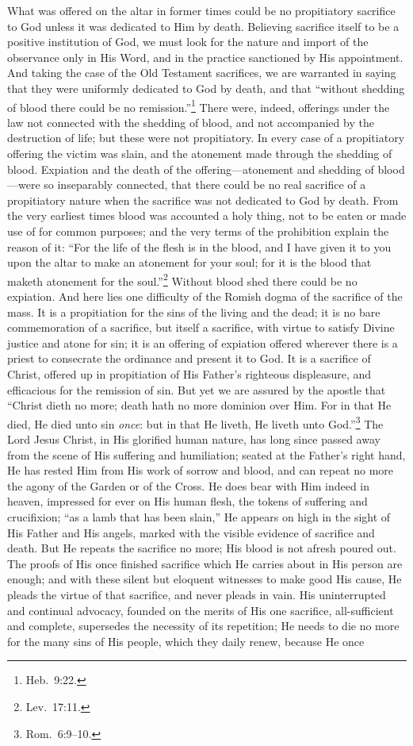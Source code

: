 \documentclass[
  english,
]{book}
\begin{document}
What was offered on the altar in former times could be no propitiatory sacrifice to God unless it was dedicated to Him by death. Believing sacrifice itself to be a positive institution of God, we must look for the nature and import of the observance only in His Word, and in the practice sanctioned by His appointment. And taking the case of the Old Testament sacrifices, we are warranted in saying that they were uniformly dedicated to God by death, and that ``without shedding of blood there could be no remission.''\footnote{Heb.~9:22.} There were, indeed, offerings under the law not connected with the shedding of blood, and not accompanied by the destruction of life; but these were not propitiatory. In every case of a propitiatory offering the victim was slain, and the atonement made through the shedding of blood. Expiation and the death of the offering---atonement and shedding of blood---were so inseparably connected, that there could be no real sacrifice of a propitiatory nature when the sacrifice was not dedicated to God by death. From the very earliest times blood was accounted a holy thing, not to be eaten or made use of for common purposes; and the very terms of the prohibition explain the reason of it: ``For the life of the flesh is in the blood, and I have given it to you upon the altar to make an atonement for your soul; for it is the blood that maketh atonement for the soul.''\footnote{Lev.~17:11.} Without blood shed there could be no expiation. And here lies one difficulty of the Romish dogma of the sacrifice of the mass. It is a propitiation for the sins of the living and the dead; it is no bare commemoration of a sacrifice, but itself a sacrifice, with virtue to satisfy Divine justice and atone for sin; it is an offering of expiation offered wherever there is a priest to consecrate the ordinance and present it to God. It is a sacrifice of Christ, offered up in propitiation of His Father's righteous displeasure, and efficacious for the remission of sin. But yet we are assured by the apostle that ``Christ dieth no more; death hath no more dominion over Him. For in that He died, He died unto sin \emph{once}: but in that He liveth, He liveth unto God.''\footnote{Rom.~6:9--10.} The Lord Jesus Christ, in His glorified human nature, has long since passed away from the scene of His suffering and humiliation; seated at the Father's right hand, He has rested Him from His work of sorrow and blood, and can repeat no more the agony of the Garden or of the Cross. He does bear with Him indeed in heaven, impressed for ever on His human flesh, the tokens of suffering and crucifixion; ``as a lamb that has been slain,'' He appears on high in the sight of His Father and His angels, marked with the visible evidence of sacrifice and death. But He repeats the sacrifice no more; His blood is not afresh poured out. The proofs of His once finished sacrifice which He carries about in His person are enough; and with these silent but eloquent witnesses to make good His cause, He pleads the virtue of that sacrifice, and never pleads in vain. His uninterrupted and continual advocacy, founded on the merits of His one sacrifice, all-sufficient and complete, supersedes the necessity of its repetition; He needs to die no more for the many sins of His people, which they daily renew, because He once 
\end{document}

